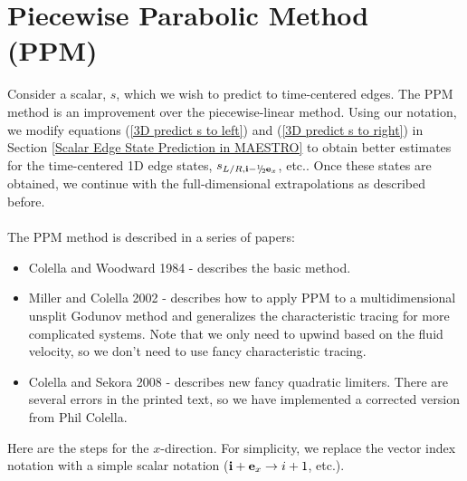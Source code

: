 \newpage

\section{Piecewise Parabolic Method (PPM)}
Consider a scalar, $s$, which we wish to predict to time-centered edges.
The PPM method is an improvement over the piecewise-linear method.
Using our notation, we modify equations (\ref{3D predict s to left}) and 
(\ref{3D predict s to right}) in Section 
\ref{Scalar Edge State Prediction in MAESTRO} to obtain better estimates
for the time-centered 1D edge states, $s_{L/R,\ib-\myhalf\eb_x}$, etc..  Once these states 
are obtained, we continue with the full-dimensional extrapolations as 
described before.\\ \\
The PPM method is described in a series of papers:
\begin{itemize}
\item Colella and Woodward 1984 - describes the basic method.
\item Miller and Colella 2002 - describes how to apply PPM to a multidimensional
unsplit Godunov method and generalizes the characteristic tracing for more complicated
systems.  Note that we only need to upwind based on the fluid velocity, so we don't
need to use fancy characteristic tracing.
\item Colella and Sekora 2008 - describes new fancy quadratic limiters.  There are
several errors in the printed text, so we have implemented a corrected version from
Phil Colella.
\end{itemize}
Here are the steps for the $x$-direction.  For simplicity, we replace the vector index notation with a simple scalar notation (${\bf i}+{\bf e}_x \rightarrow i+1$, etc.).

